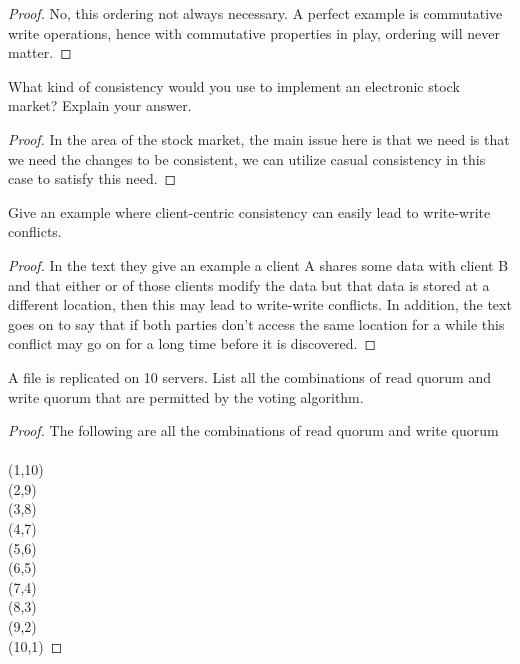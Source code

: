 \documentclass[12pt]{article}
\newenvironment{exercise}[2][Exercise]{\begin{trivlist}
\item[\hskip \labelsep {\bfseries #1}\hskip \labelsep {\bfseries #2.}]}{\end{trivlist}}
\begin{document}
\begin{proof}
No, this ordering not always necessary. A perfect example is commutative write operations, hence with commutative properties in play, ordering will never matter.
\end{proof}

\begin{exercise}{8}
 What kind of consistency would you use to implement an electronic stock market? Explain your answer.
\end{exercise}

\begin{proof}
In the area of the stock market, the main issue here is that we need is that we need the changes to be consistent, we can utilize casual consistency in this case to satisfy this need. 
\end{proof}

\begin{exercise}{9}
Give an example where client-centric consistency can easily lead to write-write conflicts. 
\end{exercise}

\begin{proof}
In the text they give an example a client A shares some data with client B and that either or of those clients modify the data but that data is stored at a different location, then this may lead to write-write conflicts. In addition, the text goes on to say that if both parties don't access the same location for a while this conflict may go on for a long time before it is discovered. 
\end{proof}

\begin{exercise}{10}
A file is replicated on 10 servers. List all the combinations of read quorum and write quorum that are permitted by the voting algorithm.
\end{exercise}

\begin{proof}
The following are all the combinations of read quorum and write quorum \\ \\ 
(1,10) \\ 
(2,9) \\ 
(3,8) \\ 
(4,7) \\ 
(5,6) \\ 
(6,5) \\ 
(7,4) \\ 
(8,3) \\ 
(9,2) \\ 
(10,1)
\end{proof}
\end{document}
